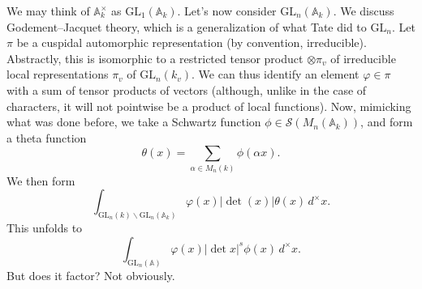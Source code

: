 \documentclass[reqno]{amsart} 
\begin{document}
We may think of $\mathbb{A}_k^\times$ as $\mathrm{GL}_1(\mathbb{A}_k)$.  Let's now consider $\mathrm{GL}_n(\mathbb{A}_k)$.  We discuss Godement--Jacquet theory, which is a generalization of what Tate did to $\mathrm{GL}_n$.  Let $\pi$ be a cuspidal automorphic representation (by convention, irreducible).  Abstractly, this is isomorphic to a restricted tensor product $\otimes \pi_v$ of irreducible local representations $\pi_v$ of $\mathrm{GL}_n(k_v)$.  We can thus identify an element $\varphi \in \pi$ with a sum of tensor products of vectors (although, unlike in the case of characters, it will not pointwise be a product of local functions).  Now, mimicking what was done before, we take a Schwartz function $\phi \in \mathcal{S}(M_n(\mathbb{A}_k))$, and form a theta function
\begin{equation*}
  \theta(x)
  =
  \sum_{\alpha \in M_n(k)}
  \phi(\alpha x).
\end{equation*}
We then form
\begin{equation*}
  \int_{\mathrm{GL}_n(k) \backslash \mathrm{GL}_n(\mathbb{A}_k)}
  \varphi(x) \lvert \det(x) \rvert \theta(x) \,d^\times x.
\end{equation*}
This unfolds to
\begin{equation*}
  \int_{\mathrm{GL}_n(\mathbb{A})} \varphi(x) \lvert \det x \rvert^s \phi(x) \, d^\times x.
\end{equation*}
But does it factor?  Not obviously.
\end{document}
